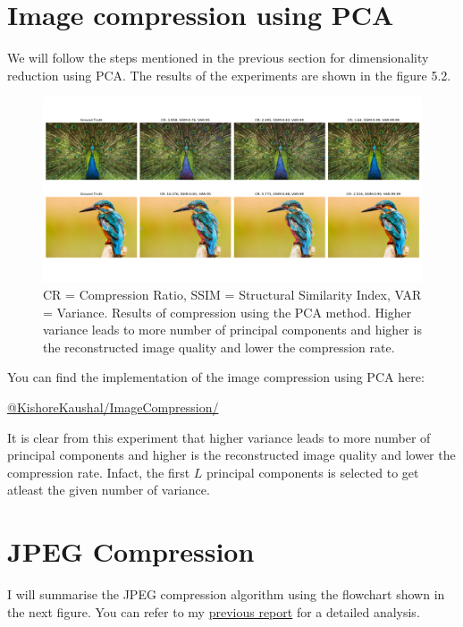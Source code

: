 \section{Image compression using PCA}


We will follow the steps mentioned in the previous section for dimensionality reduction using PCA. The results of the experiments are shown in the figure 5.2.

\begin{figure}[!ht]
    \label{fig:imageCompressionUsingPCA}
    \centering
    \includegraphics[width=1\textwidth]{../fig/chapter5/ImageCompressionWithPCA.png}
    \caption{CR = Compression Ratio, SSIM = Structural Similarity Index, VAR = Variance. Results of compression using the PCA method. Higher variance leads to more number of principal components and higher is the reconstructed image quality and lower the compression rate.}
    
\end{figure}

You can find the implementation of the image compression using PCA here:

\href{https://github.com/KishoreKaushal/ImageCompression/tree/master/PCA}{@KishoreKaushal/ImageCompression/}

It is clear from this experiment that higher variance leads to more number of principal components and higher is the reconstructed image quality and lower the compression rate. Infact, the first $L$ principal components is selected to get atleast the given number of variance.

\section{JPEG Compression}

I will summarise the JPEG compression algorithm using the flowchart shown in the next figure.
You can refer to my \href{https://github.com/KishoreKaushal/btp-report-phase2/blob/master/btp_report.pdf}{previous report} for a detailed analysis.


